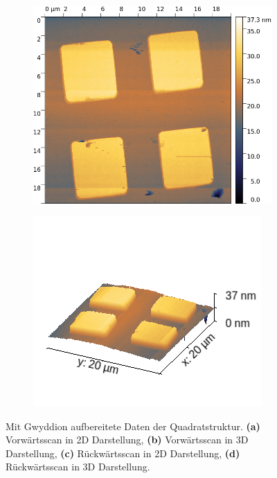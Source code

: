 \begin{figure}[H]
\begin{subfigure}{0.49\textwidth}
        \caption{}
    \end{subfigure}
    \begin{subfigure}{0.49\textwidth}
        \includegraphics[width=\textwidth]{bilder/Mikrostruktur/Quadrat_Bac_2D.png}
        \caption{}
    \end{subfigure}
    \begin{subfigure}{0.49\textwidth}
        \includegraphics[width=\textwidth]{bilder/Mikrostruktur/Quadrat_Bac_3D.png}
        \caption{}
    \end{subfigure}
    \caption{Mit Gwyddion aufbereitete Daten der Quadratstruktur. \textbf{(a)} Vorwärtsscan in 2D Darstellung, \textbf{(b)} Vorwärtsscan in 3D Darstellung, \textbf{(c)} Rückwärtsscan in 2D Darstellung, \textbf{(d)} Rückwärtsscan in 3D Darstellung.}
    \label{fig:Quadrate}
\end{figure}

